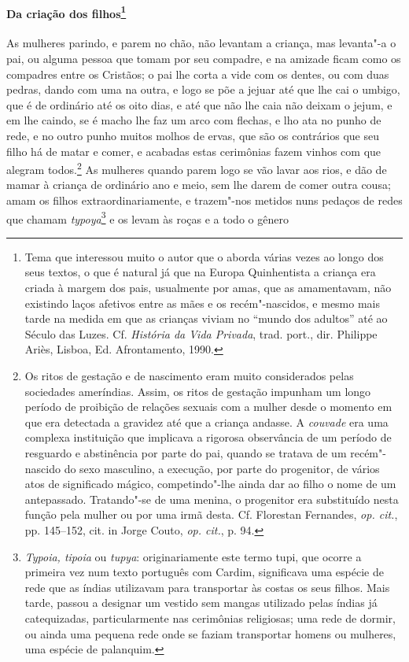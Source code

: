 \paragraph[Da criação dos filhos]{Da criação dos filhos\protect\footnote{ Tema que interessou muito o
autor que o aborda várias vezes ao longo dos seus textos, o que é
natural já que na Europa Quinhentista a criança era criada à margem dos
pais, usualmente por amas, que as amamentavam, não existindo laços
afetivos entre as mães e os recém"-nascidos, e mesmo mais tarde na
medida em que as crianças viviam no ``mundo dos adultos'' até ao Século
das Luzes. Cf. \textit{História da Vida Privada}, trad. port., dir.
Philippe Ariès, Lisboa, Ed. Afrontamento, 1990.}}

 As mulheres parindo, e parem no chão, não levantam a criança, mas
levanta"-a o pai, ou alguma pessoa que tomam por seu compadre, e na
amizade ficam como os compadres entre os Cristãos; o pai lhe corta a
vide com os dentes, ou com duas pedras, dando com uma na outra, e logo
se põe a jejuar até que lhe cai o umbigo, que é de ordinário até os
oito dias, e até que não lhe caia não deixam o jejum, e em lhe caindo,
se é macho lhe faz um arco com flechas, e lho ata no punho de rede, e
no outro punho muitos molhos de ervas, que são os contrários que seu
filho há de matar e comer, e acabadas estas cerimônias fazem vinhos com
que alegram todos.\footnote{ Os ritos de gestação e de nascimento eram
muito considerados pelas sociedades ameríndias. Assim, os ritos de
gestação impunham um longo período de proibição de relações sexuais com
a mulher desde o momento em que era detectada a gravidez até que a
criança andasse. A \textit{couvade} era uma complexa instituição que
implicava a rigorosa observância de um período de resguardo e
abstinência por parte do pai, quando se tratava de um recém"-nascido do
sexo masculino, a execução, por parte do progenitor, de vários atos de
significado mágico, competindo"-lhe ainda dar ao filho o nome de um
antepassado. Tratando"-se de uma menina, o progenitor era substituído
nesta função pela mulher ou por uma irmã desta. Cf. Florestan
Fernandes, \textit{op. cit.}, pp. 145--152, cit. in Jorge Couto, 
\textit{op. cit.}, p. 94.} As mulheres quando parem logo se vão lavar
aos rios, e dão de mamar à criança de ordinário ano e meio, sem lhe
darem de comer outra cousa; amam os filhos extraordinariamente, e
trazem"-nos metidos nuns pedaços de redes que chamam 
\textit{typoya}\footnote{ \textit{Typoia, tipoia} ou \textit{tupya}: originariamente
este termo tupi, que ocorre a primeira vez num texto português com
Cardim, significava uma espécie de rede que as índias utilizavam para
transportar às costas os seus filhos. Mais tarde, passou a designar um
vestido sem mangas utilizado pelas índias já catequizadas,
particularmente nas cerimônias religiosas; uma rede de dormir, ou ainda
uma pequena rede onde se faziam transportar homens ou mulheres, uma
espécie de palanquim.} e os levam às roças e a todo o gênero

